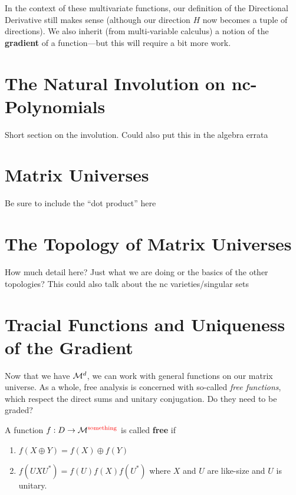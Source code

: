In the context of these multivariate functions, our definition of the
Directional Derivative still makes sense (although our direction \(H\) now
becomes a tuple of directions). We also inherit (from multi-variable calculus) a
notion of the \textbf{gradient} of a function---but this will require a bit more work.


\section{The Natural Involution on nc-Polynomials}%
\label{sec:NatInvo}

{\color{blue} Short section on the involution. Could also put this in the
  algebra errata}

\section{Matrix Universes}%
\label{sec:MatUniv}

{\color{blue} Be sure to include the ``dot product'' here}

\section{The Topology of Matrix Universes }%
\label{sec:TopManUniv}
{\color{blue} How much detail here? Just what we are doing or the basics of the
  other topologies? This could also talk about the nc varieties/singular sets}



\section{Tracial Functions and Uniqueness of the Gradient}%
\label{sec:TracGrad}
Now that we have \(\mathcal{M}^d\), we can work with general functions on our matrix
universe. As a whole, free analysis is concerned with so-called \emph{free
  functions}, which respect the direct sums and unitary conjugation.
{\color{red} Do they need to be graded?}
\begin{definition}
\label{def:FreeFun}
  A function \(f: D\to \mathcal{M}^{\color{red} \text{something}}\) is called \textbf{free} if
  \begin{enumerate}
    \item \(f(X\oplus Y)= f(X) \oplus f(Y)\)
    \item \(f(U X U^*) = f(U)f(X)f(U^*)\) where \(X\) and \(U\) are like-size
          and \(U\) is unitary.
  \end{enumerate}
\end{definition}

